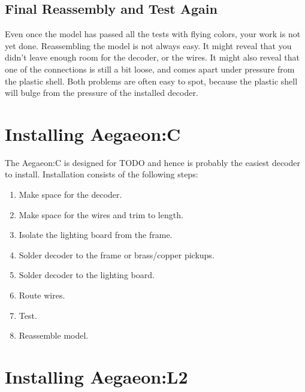 \documentclass[12pt,letterpaper,draft]{memoir} %
\begin{document}
\subsection{Final Reassembly and Test Again}

Even once the model has passed all the tests with flying colors, your work is not yet done. Reassembling the model is not always easy. It might reveal that you didn't leave enough room for the decoder, or the wires. It might also reveal that one of the connections is still a bit loose, and comes apart under pressure from the plastic shell. Both problems are often easy to spot, because the plastic shell will bulge from the pressure of the installed decoder.

\section{Installing Aegaeon:C}

The Aegaeon:C is designed for TODO and hence is probably the easiest decoder to install. Installation consists of the following steps:
\begin{enumerate}
\item Make space for the decoder.
\item Make space for the wires and trim to length.
\item Isolate the lighting board from the frame.
\item Solder decoder to the frame or brass/copper pickups.
\item Solder decoder to the lighting board.
\item Route wires.
\item Test.
\item Reassemble model.
\end{enumerate}


\section{Installing Aegaeon:L2}

\end{document}

